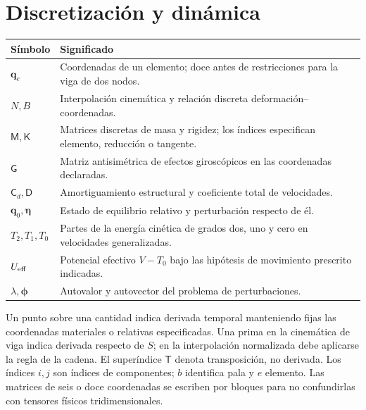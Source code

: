 \documentclass[11pt,a4paper,oneside]{report}
\newcommand{\vct}[1]{\bm{#1}}
\newcommand{\tr}{\mathsf T}
\begin{document}
\section{Discretización y dinámica}
\begin{longtable}{p{}p{}}
\toprule Símbolo & Significado \\\midrule\endhead
$\vct q_e$ & Coordenadas de un elemento; doce antes de restricciones para la viga de dos nodos.\\
$N,B$ & Interpolación cinemática y relación discreta deformación--coordenadas.\\
$\mathsf M,\mathsf K$ & Matrices discretas de masa y rigidez; los índices especifican elemento, reducción o tangente.\\
$\mathsf G$ & Matriz antisimétrica de efectos giroscópicos en las coordenadas declaradas.\\
$\mathsf C_d,\mathsf D$ & Amortiguamiento estructural y coeficiente total de velocidades.\\
$\vct q_0,\vct\eta$ & Estado de equilibrio relativo y perturbación respecto de él.\\
$T_2,T_1,T_0$ & Partes de la energía cinética de grados dos, uno y cero en velocidades generalizadas.\\
$U_{\rm eff}$ & Potencial efectivo $V-T_0$ bajo las hipótesis de movimiento prescrito indicadas.\\
$\lambda,\vct\phi$ & Autovalor y autovector del problema de perturbaciones.\\
\bottomrule
\end{longtable}
Un punto sobre una cantidad indica derivada temporal manteniendo fijas las coordenadas materiales o relativas especificadas. Una prima en la cinemática de viga indica derivada respecto de $S$; en la interpolación normalizada debe aplicarse la regla de la cadena. El superíndice $\tr$ denota transposición, no derivada. Los índices $i,j$ son índices de componentes; $b$ identifica pala y $e$ elemento. Las matrices de seis o doce coordenadas se escriben por bloques para no confundirlas con tensores físicos tridimensionales.
\end{document}
